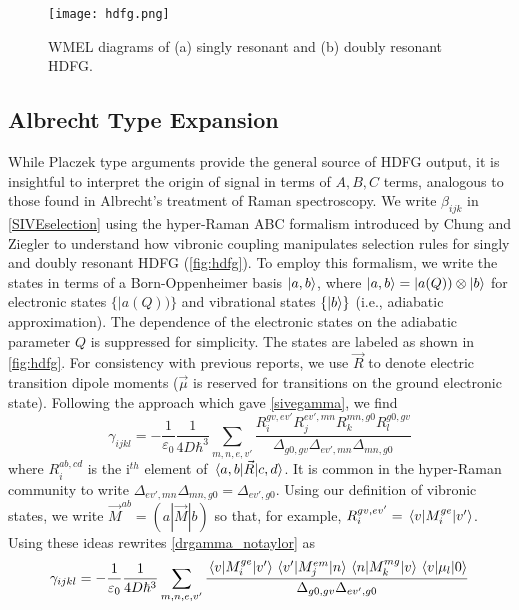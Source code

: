 \documentclass[aip, jcp, reprint, onecolumn]{revtex4-2}
\begin{document}
\begin{figure}[!htbp]
	\centering
	\texttt{[image: hdfg.png]}
	\caption{WMEL diagrams of (a) singly resonant and (b) doubly resonant HDFG. 
	}
	\label{fig:hdfg}
\end{figure}
\subsection{Albrecht Type Expansion}
While Placzek type arguments provide the general source of HDFG output, it is insightful to interpret the origin of signal in terms of $A,B,C$ terms, analogous to those found in Albrecht's treatment of Raman spectroscopy.\cite{Albrecht1961, Ziegler1988} 
We write $\beta_{ijk}$ in \autoref{SIVEselection} using the hyper-Raman ABC formalism introduced by Chung and Ziegler to understand how vibronic coupling manipulates selection rules for singly and doubly resonant HDFG (\autoref{fig:hdfg}). \cite{Ziegler1988, Baranov1990}
To employ this formalism, we write the states in terms of a Born-Oppenheimer basis $\ket{a,b}$, where $\ket{a,b} = |a(Q)) \otimes \ket{b}$ for electronic states $\{|a(Q))\}$ and vibrational states $\{\ket{b}\}$ (i.e., adiabatic approximation). \cite{BornOppenheimer, Tang1970}
The dependence of the electronic states on the adiabatic parameter $Q$ is suppressed for simplicity.
The states are labeled as shown in \autoref{fig:hdfg}.
For consistency with previous reports, we use $\vec{R}$ to denote electric transition dipole moments ($\vec{\mu}$ is reserved for transitions on the ground electronic state). \cite{Tang1970}
Following the approach which gave \autoref{sivegamma}, we find
\begin{equation}\label{drgamma_notaylor}
	\gamma_{ijkl} = -\frac{1}{\varepsilon_0} \frac{1}{4D \hbar^3} \sum_{m,n,e,v'} \frac{
		R_{i}^{gv, ev'} 
		R_{j}^{ev',mn} 
		R_{k}^{mn,g0} 
		R_{l}^{g0,gv} 
	}{\Delta_{g0,gv}
		\Delta_{ev', mn}
		\Delta_{mn, g0}
	}
\end{equation}
where $R_{i}^{ab,cd}$ is the i$^{th}$ element of $\mel{a,b}{\vec{R}}{c,d}$.
It is common in the hyper-Raman community to write $\Delta_{ev', mn} \Delta_{mn, g0} = \Delta_{ev', g0}$.
Using our definition of vibronic states, we write $\vec{M}^{ab} = (a|\vec{M}|b)$ so that, for example,
$R_{i}^{gv,ev'} = \mel{v}{M_i^{ge}}{v'}$.
Using these ideas rewrites \autoref{drgamma_notaylor} as
\begin{equation}\label{drgamma_notaylor_1}
	\begin{split}
		\gamma_{ijkl} &= -\frac{1}{\varepsilon_0} \frac{1}{4D \hbar^3} \sum_{m,n,e,v'} \frac{
			\mel{v}{M_{i}^{ge}}{v'} 
			\mel{v'}{M_{j}^{em}}{n}
			\mel{n}{M_{k}^{mg} }{v}
			\mel{v}{\mu_{l}}{0}
		}{\Delta_{g0,gv}
			\Delta_{ev',g0}	} \\
	\end{split}
\end{equation}
\end{document}

